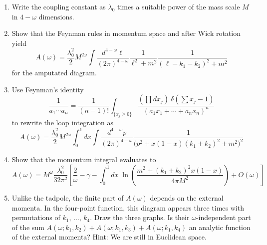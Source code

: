 \documentclass[12pt]{article}
\begin{document}
\begin{enumerate}
\item Write the coupling constant as $\lambda_0$ times a suitable
  power of the mass scale $M$ in $4-\omega$ dimensions.
\item Show that the Feynman rules in momentum space and after Wick
  rotation yield
  \begin{equation}
    \nonumber
    A(\omega) = \frac{\lambda_0^2}{2} 
    M^{2\omega} \int \frac{d^{4-\omega}\ell}{(2\pi)^{4-\omega}}
    \frac{1}{\ell^2+m^2} \frac{1}{(\ell-k_1-k_2)^2+m^2}
  \end{equation}
  for the amputated diagram.
\item Use Feynman's identity
  \begin{equation}
    \nonumber
    \frac{1}{a_1\cdots a_n} = 
    \frac{1}{(n-1)!} \int_{\{x_j\geq 0\}} 
    \frac{
      (\prod dx_j) ~ \delta(\sum x_j - 1)
    }{
      (a_1x_1 + \cdots + a_n x_n)^n
    }
  \end{equation}
  to rewrite the loop integration as
  \begin{equation}
    \nonumber
    A(\omega) = \frac{\lambda_0^2}{2} 
    M^{2\omega} \int_0^1 dx \int 
    \frac{d^{4-\omega}p}{(2\pi)^{4-\omega}}
    \frac{1}{\big(p^2 + x(1-x)(k_1+k_2)^2+m^2\big)^2}
  \end{equation}
\item Show that the momentum integral evaluates to
  \begin{equation}
    \nonumber
    A(\omega) = 
    M^{\omega} \frac{\lambda_0^2}{32\pi^2} 
    \left[
      \frac{2}{\omega} - \gamma - 
      \int_0^1 \!\!dx \; 
      \ln\left(\frac{m^2+(k_1+k_2)^2 x (1-x)}{4\pi M^2}\right)
      + O(\omega)
    \right]
  \end{equation}
\item Unlike the tadpole, the finite part of $A(\omega)$ depends on
  the external momenta. In the four-point function, this diagram
  appears three times with permutations of $k_1$, $\dots$, $k_4$. Draw
  the three graphs. Is their $\omega$-independent part of the sum
  $A(\omega; k_1, k_2) + A(\omega; k_1, k_3) + A(\omega; k_1, k_4)$ an
  analytic function of the external momenta? Hint: We are still in
  Euclidean space.
\end{enumerate}
\end{document}

